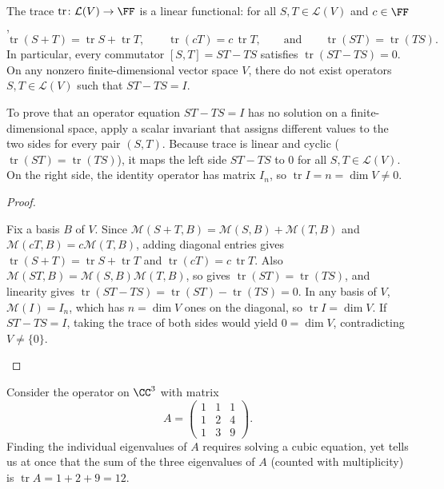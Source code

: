 \documentclass[10pt]{scrartcl}
\DeclareMathOperator{\tr}{tr}\DeclareMathOperator{\nul}{null}\DeclareMathOperator{\range}{range}\DeclareMathOperator{\spn}{span}
\newcommand{\LL}{\mathcal L}\newcommand{\PP}{\mathcal P}\newcommand{\MM}{\mathcal M}
\begin{document}
\begin{proposition*}[Prop.~80 / LADR 8.56, 8.57: Linearity of trace and nonexistence of $ST-TS=I$]
  The trace $\tr\colon\LL(V)\to\FF$ is a linear functional: for all $S,T\in\LL(V)$ and $c\in\FF$,
  \[
    \tr(S+T)=\tr S+\tr T, \qquad \tr(cT)=c\,\tr T, \qquad \text{and}\qquad \tr(ST)=\tr(TS).
  \]
  In particular, every commutator $[S,T]=ST-TS$ satisfies $\tr(ST-TS)=0$. On any nonzero finite-dimensional vector space $V$, there do not exist operators $S,T\in\LL(V)$ such that $ST-TS=I$.
\end{proposition*}
\begin{ideabox}
  To prove that an operator equation $ST-TS=I$ has no solution on a finite-dimensional space, apply a scalar invariant that assigns different values to the two sides for every pair $(S,T)$. Because trace is linear and cyclic ($\tr(ST)=\tr(TS)$), it maps the left side $ST-TS$ to $0$ for all $S,T\in\LL(V)$. On the right side, the identity operator has matrix $I_n$, so $\tr I=n=\dim V\ne 0$.
\end{ideabox}
\begin{proof}
  \begin{steps}
    \ii Fix a basis $B$ of $V$. Since $\MM(S+T,B)=\MM(S,B)+\MM(T,B)$ and $\MM(cT,B)=c\MM(T,B)$, adding diagonal entries gives $\tr(S+T)=\tr S+\tr T$ and $\tr(cT)=c\,\tr T$.
    \ii Also $\MM(ST,B)=\MM(S,B)\MM(T,B)$, so  gives $\tr(ST)=\tr(TS)$, and linearity gives $\tr(ST-TS)=\tr(ST)-\tr(TS)=0$.
    \ii In any basis of $V$, $\MM(I)=I_n$, which has $n=\dim V$ ones on the diagonal, so $\tr I=\dim V$.
    \ii If $ST-TS=I$, taking the trace of both sides would yield $0=\dim V$, contradicting $V\ne\{0\}$.
  \end{steps}
\end{proof}

\begin{example*}
  Consider the operator on $\CC^3$ with matrix
  \[
    A = \begin{pmatrix} 1 & 1 & 1 \\ 1 & 2 & 4 \\ 1 & 3 & 9 \end{pmatrix}.
  \]
  Finding the individual eigenvalues of $A$ requires solving a cubic equation, yet  tells us at once that the sum of the three eigenvalues of $A$ (counted with multiplicity) is $\tr A = 1 + 2 + 9 = 12$.
\end{example*}
\end{document}
